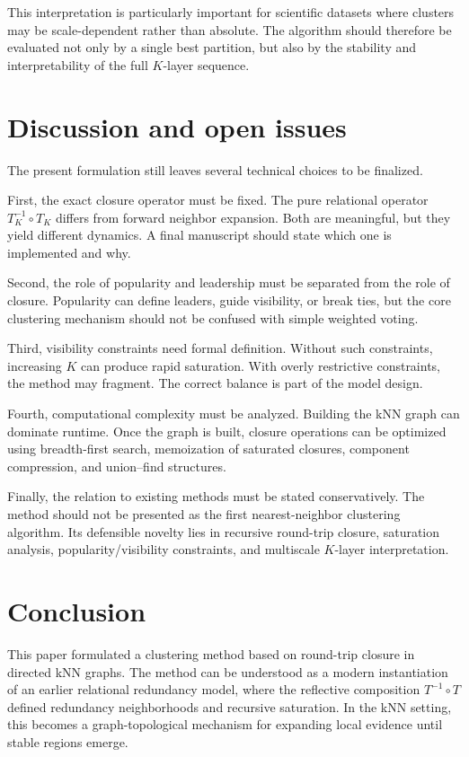 \documentclass[11pt,a4paper]{article}
\begin{document}
This interpretation is particularly important for scientific datasets where clusters may be scale-dependent rather than absolute. The algorithm should therefore be evaluated not only by a single best partition, but also by the stability and interpretability of the full $K$-layer sequence.

\section{Discussion and open issues}
\label{sec:discussion}

The present formulation still leaves several technical choices to be finalized.

First, the exact closure operator must be fixed. The pure relational operator $T_K^{-1}\circ T_K$ differs from forward neighbor expansion. Both are meaningful, but they yield different dynamics. A final manuscript should state which one is implemented and why.

Second, the role of popularity and leadership must be separated from the role of closure. Popularity can define leaders, guide visibility, or break ties, but the core clustering mechanism should not be confused with simple weighted voting.

Third, visibility constraints need formal definition. Without such constraints, increasing $K$ can produce rapid saturation. With overly restrictive constraints, the method may fragment. The correct balance is part of the model design.

Fourth, computational complexity must be analyzed. Building the kNN graph can dominate runtime. Once the graph is built, closure operations can be optimized using breadth-first search, memoization of saturated closures, component compression, and union--find structures.

Finally, the relation to existing methods must be stated conservatively. The method should not be presented as the first nearest-neighbor clustering algorithm. Its defensible novelty lies in recursive round-trip closure, saturation analysis, popularity/visibility constraints, and multiscale $K$-layer interpretation.

\section{Conclusion}

This paper formulated a clustering method based on round-trip closure in directed kNN graphs. The method can be understood as a modern instantiation of an earlier relational redundancy model, where the reflective composition $T^{-1}\circ T$ defined redundancy neighborhoods and recursive saturation. In the kNN setting, this becomes a graph-topological mechanism for expanding local evidence until stable regions emerge.
\end{document}
